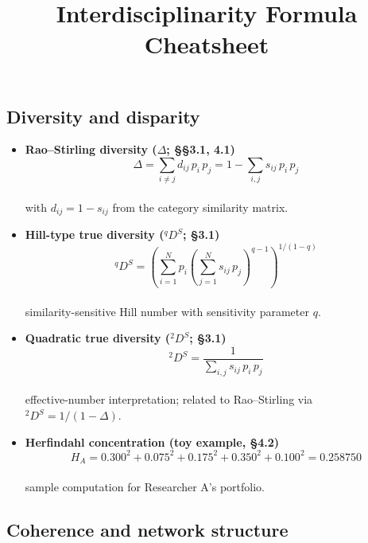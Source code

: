 \documentclass[
  10pt,
  twocolumn,
]{article}
\title{Interdisciplinarity Formula Cheatsheet}
\author{}
\date{}
\begin{document}
\maketitle

\hypertarget{diversity-and-disparity}{%
\subsection{Diversity and disparity}\label{diversity-and-disparity}}

\begin{itemize}
\item
  \textbf{Rao--Stirling diversity (\(\Delta\); §§3.1, 4.1)}\\
  \[\Delta = \sum_{i \neq j} d_{ij}\, p_i\, p_j = 1 - \sum_{i,j} s_{ij}\, p_i\, p_j\]\\
  with \(d_{ij} = 1 - s_{ij}\) from the category similarity matrix.
\item
  \textbf{Hill-type true diversity (\({}^q D^S\); §3.1)}\\
  \[ {}^qD^S = \left( \sum_{i=1}^{N} p_i \left( \sum_{j=1}^{N} s_{ij}\, p_j \right)^{q-1} \right)^{1/(1-q)} \]\\
  similarity-sensitive Hill number with sensitivity parameter \(q\).
\item
  \textbf{Quadratic true diversity (\({}^2 D^S\); §3.1)}\\
  \[ {}^2D^S = \frac{1}{\sum_{i,j} s_{ij}\, p_i\, p_j} \]\\
  effective-number interpretation; related to Rao--Stirling via
  \({}^2D^S = 1/(1 - \Delta)\).
\item
  \textbf{Herfindahl concentration (toy example, §4.2)}\\
  \[ H_A = 0.300^2 + 0.075^2 + 0.175^2 + 0.350^2 + 0.100^2 = 0.258750 \]\\
  sample computation for Researcher A's portfolio.
\end{itemize}

\hypertarget{coherence-and-network-structure}{%
\subsection{Coherence and network
structure}\label{coherence-and-network-structure}}
\end{document}
